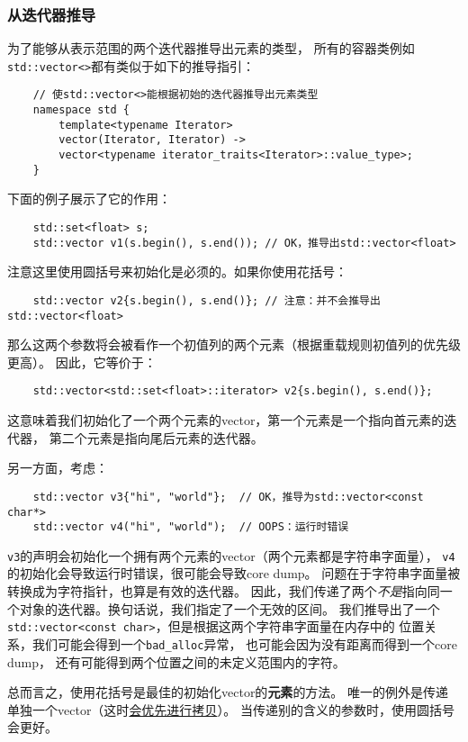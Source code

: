 \subsubsection*{从迭代器推导}
为了能够从表示范围的两个迭代器推导出元素的类型，
所有的容器类例如\texttt{std::vector<>}都有类似于如下的推导指引：
\begin{lstlisting}
    // 使std::vector<>能根据初始的迭代器推导出元素类型
    namespace std {
        template<typename Iterator>
        vector(Iterator, Iterator) ->
        vector<typename iterator_traits<Iterator>::value_type>;
    }
\end{lstlisting}
下面的例子展示了它的作用：
\begin{lstlisting}
    std::set<float> s;
    std::vector v1(s.begin(), s.end()); // OK，推导出std::vector<float>
\end{lstlisting}
注意这里使用圆括号来初始化是必须的。如果你使用花括号：
\begin{lstlisting}
    std::vector v2{s.begin(), s.end()}; // 注意：并不会推导出std::vector<float>
\end{lstlisting}
那么这两个参数将会被看作一个初值列的两个元素（根据重载规则初值列的优先级更高）。
因此，它等价于：
\begin{lstlisting}
    std::vector<std::set<float>::iterator> v2{s.begin(), s.end()};
\end{lstlisting}
这意味着我们初始化了一个两个元素的vector，第一个元素是一个指向首元素的迭代器，
第二个元素是指向尾后元素的迭代器。

另一方面，考虑：
\begin{lstlisting}
    std::vector v3{"hi", "world"};  // OK，推导为std::vector<const char*>
    std::vector v4("hi", "world");  // OOPS：运行时错误
\end{lstlisting}
\texttt{v3}的声明会初始化一个拥有两个元素的vector（两个元素都是字符串字面量），
\texttt{v4}的初始化会导致运行时错误，很可能会导致core dump。
问题在于字符串字面量被转换成为字符指针，也算是有效的迭代器。
因此，我们传递了两个\emph{不是}指向同一个对象的迭代器。换句话说，我们指定了一个无效的区间。
我们推导出了一个\texttt{std::vector<const char>}，但是根据这两个字符串字面量在内存中的
位置关系，我们可能会得到一个\texttt{bad\_alloc}异常，
也可能会因为没有距离而得到一个core dump，
还有可能得到两个位置之间的未定义范围内的字符。

总而言之，使用花括号是最佳的初始化vector的\textbf{元素}的方法。
唯一的例外是传递单独一个vector（这时\hyperref[ch9.1.1]{会优先进行拷贝}）。
当传递别的含义的参数时，使用圆括号会更好。

